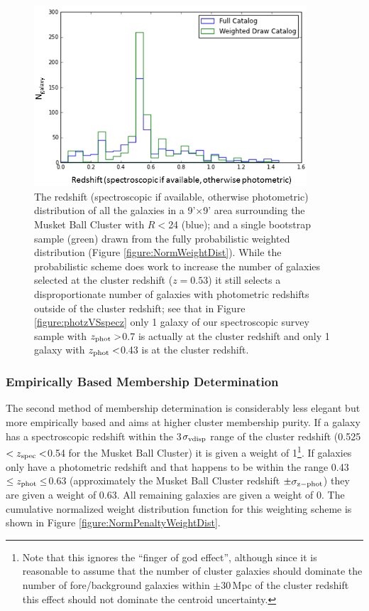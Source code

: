 \begin{figure}
\centering
\includegraphics[width=4in]{Chapter4/AnalysisFiles/zdist_randomweightdraw_reformat.png}
\caption[Comparison of parent galaxy redshift distribution with weighted random draw distribution.]{
The redshift (spectroscopic if available, otherwise photometric) distribution of all the galaxies in a 9'$\times$9' area surrounding the Musket Ball Cluster with $R<$24 (blue); and a single bootstrap sample (green) drawn from the fully probabilistic weighted distribution (Figure \ref{figure:NormWeightDist}).
While the probabilistic scheme does work to increase the number of galaxies selected at the cluster redshift ($z=0.53$) it still selects a disproportionate number of galaxies with photometric redshifts outside of the cluster redshift; see that in Figure \ref{figure:photzVSspecz} only 1 galaxy of our spectroscopic survey sample with $z_{\rm phot}>$0.7 is actually at the cluster redshift and only 1 galaxy with $z_{\rm phot}<$0.43 is at the cluster redshift.
}
\label{figure:ProbWeightDist}
\end{figure}


\subsubsection{Empirically Based Membership Determination}\label{section:EmpiricalWeightScheme}

The second method of membership determination is considerably less elegant but more empirically based and aims at higher cluster membership purity.
If a galaxy has a spectroscopic redshift within the 3$\sigma_{\rm vdisp}$ range of the cluster redshift (0.525$<z_{\rm spec}<$0.54 for the Musket Ball Cluster) it is given a weight of 1\footnote{
Note that this ignores the ``finger of god effect'', although since it is reasonable to assume that the number of cluster galaxies should dominate the number of fore/background galaxies within $\pm$30\,Mpc of the cluster redshift this effect should not dominate the centroid uncertainty.}.
If galaxies only have a photometric redshift and that happens to be within the range 0.43$\leq z_{\rm phot} \leq$0.63 (approximately the Musket Ball Cluster redshift $\pm \sigma_{\rm z-phot}$) they are given a weight of 0.63.
All remaining galaxies are given a weight of 0.
The cumulative normalized weight distribution function for this weighting scheme is shown in Figure \ref{figure:NormPenaltyWeightDist}.

